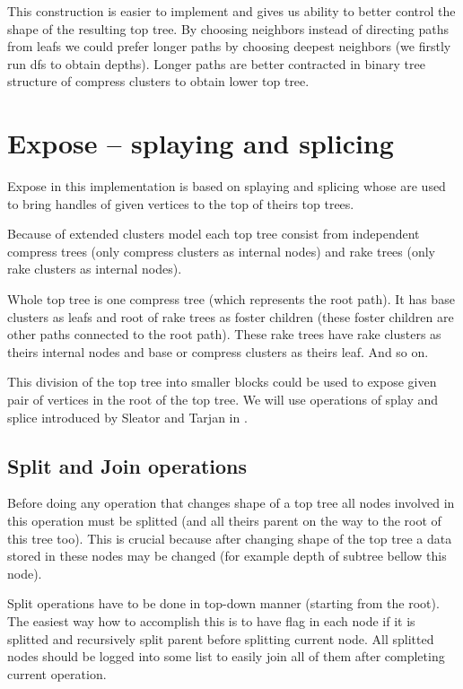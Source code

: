 This construction is easier to implement and gives us ability to better control
the shape of the resulting top tree. By choosing neighbors instead of directing
paths from leafs we could prefer longer paths by choosing deepest neighbors
(we firstly run \gls{dfs} to obtain depths). Longer paths are better contracted
in binary tree structure of compress clusters to obtain lower top tree.

\section{Expose -- splaying and splicing}

Expose in this implementation is based on splaying and splicing whose are used
to bring handles of given vertices to the top of theirs top trees.

Because of extended clusters model each top tree consist from independent
{\I compress trees} (only compress clusters as internal nodes) and
{\I rake trees} (only rake clusters as internal nodes).

Whole top tree is one compress tree (which represents the {\I root path}). It
has base clusters as leafs and root of rake trees as foster children (these
foster children are other paths connected to the root path). These rake trees
have rake clusters as theirs internal nodes and base or compress clusters as
theirs leaf. And so on.

This division of the top tree into smaller blocks could be used to expose given
pair of vertices in the root of the top tree. We will use operations of
{\I splay} and {\I splice} introduced by Sleator and Tarjan in
\cite{SelfAdjustingBST}.

\subsection{Split and Join operations}

Before doing any operation that changes shape of a top tree all nodes involved
in this operation must be splitted (and all theirs parent on the way to the root
of this tree too). This is crucial because after changing shape of the top tree
a data stored in these nodes may be changed (for example depth of subtree bellow
this node).

Split operations have to be done in top-down manner (starting from the root). The
easiest way how to accomplish this is to have flag in each node if it is
splitted and recursively split parent before splitting current node. All
splitted nodes should be logged into some list to easily join all of them after
completing current operation.

